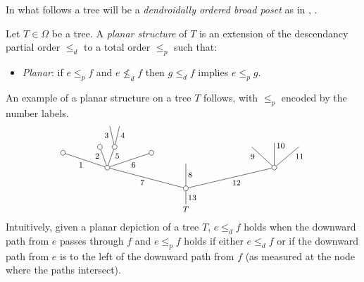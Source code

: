 \documentclass[a4paper,10pt]{article}%
\begin{document}
In what follows a tree will be a 
\textit{dendroidally ordered broad poset}
as in \cite{We12}, \cite[Def. 5.9]{Pe17}.


\begin{definition}\label{PLANARIZE DEF}
	Let $T \in \Omega$ be a tree. A \textit{planar structure} of $T$ is an extension of the descendancy partial order $\leq_d$ to a total order $\leq_p$ such that: 
	\begin{itemize}
		\item \textit{Planar}: if $e \leq_p f$ and $e \nleq_d f$ then 
		$g \leq_d f$ implies $e \leq_p g$.
	\end{itemize} 
\end{definition}


\begin{example}
An example of a planar structure on a tree $T$ follows, with $\leq_p$ encoded by the number labels.
\begin{equation}\label{PLANAREX EQ}
	\begin{tikzpicture}[grow=up,auto,level distance=2.1em,
	every node/.style = {font=\footnotesize,inner sep=2pt},
	dummy/.style={circle,draw,inner sep=0pt,minimum size=1.75mm}]
		\node at (0,0) {$T$}
			child{node [dummy] {}
				child[sibling distance = 9em]{node [dummy] {}
					child[sibling distance = 2.5em]{
					edge from parent node [near end,swap] {$11$}}
					child[level distance=2.5em]{
					edge from parent node [very near end,swap] {$10$}}				
					child[sibling distance = 2.3em]{
					edge from parent node [near end] {$9$}}
				edge from parent node [swap] {12}}
				child[level distance =2.5em]{
				edge from parent node [swap] {$8$}}
				child[sibling distance = 8em]{node [dummy] {}
					child[sibling distance =3em, level distance = 1.5 em]{node [dummy] {}
					edge from parent node [swap] {$6$}}
					child[sibling distance = 1.5em]{node [dummy] {}
						child[sibling distance =1em]{
						edge from parent node [swap,near end] {$4$}}
						child[sibling distance =1em]{
						edge from parent node [near end] {$3$}}
					edge from parent node [very near end,swap] {$5$}}
					child[sibling distance =1.5em]{node [dummy] {}
					edge from parent node [very near end] {$2$}}
					child[sibling distance =3em,level distance =1.5em]{node [dummy] {}
					edge from parent node {$1$}}
				edge from parent node {$7$}}
			edge from parent node [swap] {$13$}};
	\end{tikzpicture}
\end{equation}
Intuitively, given a planar depiction of a tree $T$, $e \leq_d f$ holds when the downward path from $e$ passes through $f$
and $e \leq_p f$ holds if either
$e \leq_d f$ or if the downward path from $e$ is to the left of the downward path from $f$ (as measured at the node where the paths intersect).
\end{example}
\end{document}
